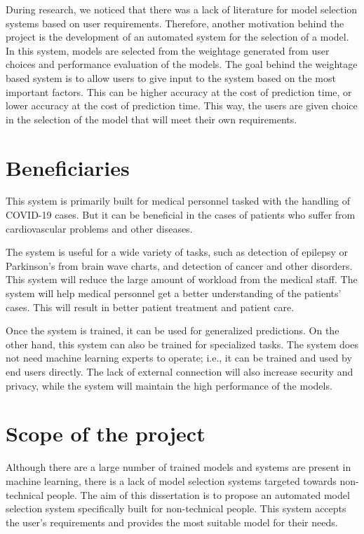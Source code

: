 During research, we noticed that there was a lack of literature for model selection systems based on user requirements. Therefore, another motivation behind the project is the development of an automated system for the selection of a model. In this system, models are selected from the weightage generated from user choices and performance evaluation of the models. The goal behind the weightage based system is to allow users to give input to the system based on the most important factors. This can be higher accuracy at the cost of prediction time, or lower accuracy at the cost of prediction time. This way, the users are given choice in the selection of the model that will meet their own requirements.

\section{Beneficiaries}\label{sec:beneficiaries}

This system is primarily built for medical personnel tasked with the handling of COVID-19 cases. But it can be beneficial in the cases of patients who suffer from cardiovascular problems and other diseases.

The system is useful for a wide variety of tasks, such as detection of epilepsy or Parkinson's from brain wave charts, and detection of cancer and other disorders. This system will reduce the large amount of workload from the medical staff. The system will help medical personnel get a better understanding of the patients' cases. This will result in better patient treatment and patient care.

Once the system is trained, it can be used for generalized predictions. On the other hand, this system can also be trained for specialized tasks. The system does not need machine learning experts to operate; i.e., it can be trained and used by end users directly. The lack of external connection will also increase security and privacy, while the system will maintain the high performance of the models.

\section{Scope of the project}\label{sec:scope_of_the_project}

Although there are a large number of trained models and systems are present in machine learning, there is a lack of model selection systems targeted towards non-technical people. The aim of this dissertation is to propose an automated model selection system specifically built for non-technical people. This system accepts the user's requirements and provides the most suitable model for their needs.

